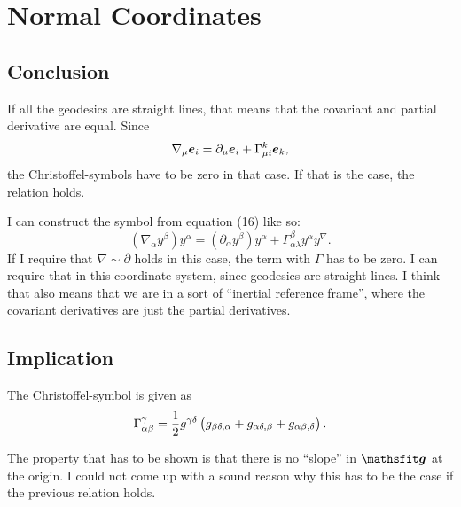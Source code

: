 \section{Normal Coordinates}

\subsection{Conclusion}

If all the geodesics are straight lines, that means that the covariant and
partial derivative are equal. Since
\[
    \nabla_\mu \boldsymbol{e}_i = \partial_\mu \boldsymbol{e}_i + \Gamma^k_{\mu i} \boldsymbol{e}_k,
\]
the Christoffel-symbols have to be zero in that case. If that is the case, the
relation holds.

I can construct the symbol from equation (16) like so:
\[
    (\nabla_\alpha y^\beta) y^\alpha = (\partial_\alpha y^\beta) y^\alpha
    + \Gamma^\beta_{\alpha\lambda} y^\alpha y^\nabla.
\]
If I require that $\nabla \sim \partial$ holds in this case, the term with
$\Gamma$ has to be zero. I can require that in this coordinate system, since
geodesics are straight lines. I think that also means that we are in a sort of
“inertial reference frame”, where the covariant derivatives are just the
partial derivatives.

\subsection{Implication}

The Christoffel-symbol is given as
\[
    \Gamma^\gamma_{\alpha\beta}
    = \frac12 g^{\gamma\delta} \del{
        g_{\beta\delta,\alpha} + g_{\alpha\delta,\beta} +
        g_{\alpha\beta,\delta}
    }.
\]

The property that has to be shown is that there is no “slope” in $\tens g$ at
the origin. I could not come up with a sound reason why this has to be the case
if the previous relation holds.


\IfFileExists{\bibliographyfile}{
    \printbibliography
}{}



